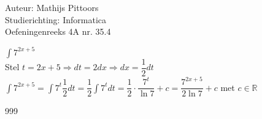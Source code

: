 \documentclass[a4paper]{article}
\newcommand{\intt}{\displaystyle\int}
\begin{document}
  
\noindent \large Auteur: Mathijs Pittoors \\
\noindent \large Studierichting: Informatica\\
\noindent \large Oefeningenreeks 4A nr. 35.4\\

\medskip

\normalsize

$\intt7^{2x+5}$\\

Stel $t = 2x+5 \Rightarrow dt = 2dx \Rightarrow dx = \dfrac{1}{2} dt$\\

$\intt7^{2x+5} = \intt 7^t \dfrac{1}{2} dt = \dfrac{1}{2} \intt  7^t dt = \dfrac{1}{2} \cdot \dfrac{7^t}{\ln 7} + c = \dfrac{7^{2x+5}}{2\ln 7} + c$ met $c \in \mathbb{R}$

\begin{thebibliography}{999}
\end{thebibliography}
\end{document}
